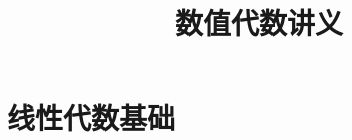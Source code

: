 \documentclass{book}
\begin{document}
\title{数值代数讲义}
\maketitle

\chapter{线性代数基础}


\cite{stein2003}


\end{document}
